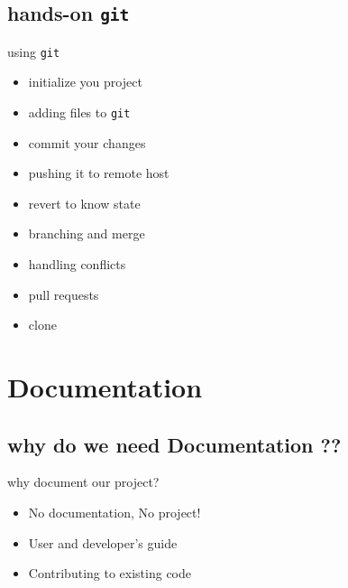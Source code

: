 \documentclass{beamer}
\begin{document}
 \subsection{hands-on {\tt git}}
 \begin{frame}{using {\tt git}}
     \begin{itemize} \pause
     \item initialize you project \pause
     \item adding files to {\tt git} \pause
     \item commit your changes \pause
     \item pushing it to remote host \pause
     \item revert to know state \pause
     \item branching and merge \pause
     \item handling conflicts \pause
     \item pull requests \pause
     \item clone 
     \end{itemize}
 \end{frame}

 \section{Documentation}
 \subsection{why do we need Documentation ??}
 \begin{frame}{why document our project?}
     \begin{itemize}
     \item No documentation, No project!
     \item User and developer's guide
     \item Contributing to existing code 
     \end{itemize}
 \end{frame}
\end{document}
